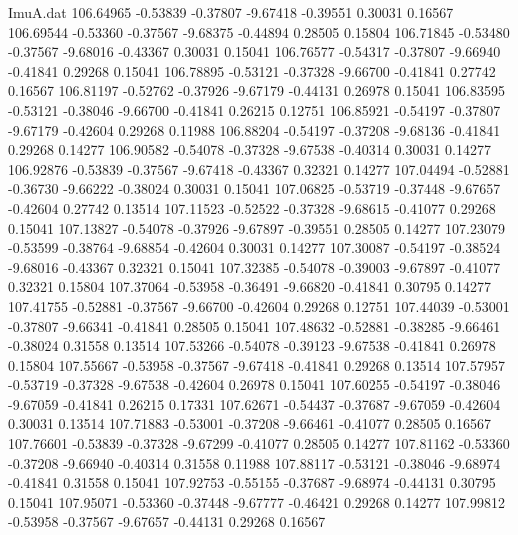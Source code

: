 \begin{filecontents}{ImuA.dat}
 106.64965   -0.53839   -0.37807   -9.67418   -0.39551    0.30031    0.16567
 106.69544   -0.53360   -0.37567   -9.68375   -0.44894    0.28505    0.15804
 106.71845   -0.53480   -0.37567   -9.68016   -0.43367    0.30031    0.15041
 106.76577   -0.54317   -0.37807   -9.66940   -0.41841    0.29268    0.15041
 106.78895   -0.53121   -0.37328   -9.66700   -0.41841    0.27742    0.16567
 106.81197   -0.52762   -0.37926   -9.67179   -0.44131    0.26978    0.15041
 106.83595   -0.53121   -0.38046   -9.66700   -0.41841    0.26215    0.12751
 106.85921   -0.54197   -0.37807   -9.67179   -0.42604    0.29268    0.11988
 106.88204   -0.54197   -0.37208   -9.68136   -0.41841    0.29268    0.14277
 106.90582   -0.54078   -0.37328   -9.67538   -0.40314    0.30031    0.14277
 106.92876   -0.53839   -0.37567   -9.67418   -0.43367    0.32321    0.14277
 107.04494   -0.52881   -0.36730   -9.66222   -0.38024    0.30031    0.15041
 107.06825   -0.53719   -0.37448   -9.67657   -0.42604    0.27742    0.13514
 107.11523   -0.52522   -0.37328   -9.68615   -0.41077    0.29268    0.15041
 107.13827   -0.54078   -0.37926   -9.67897   -0.39551    0.28505    0.14277
 107.23079   -0.53599   -0.38764   -9.68854   -0.42604    0.30031    0.14277
 107.30087   -0.54197   -0.38524   -9.68016   -0.43367    0.32321    0.15041
 107.32385   -0.54078   -0.39003   -9.67897   -0.41077    0.32321    0.15804
 107.37064   -0.53958   -0.36491   -9.66820   -0.41841    0.30795    0.14277
 107.41755   -0.52881   -0.37567   -9.66700   -0.42604    0.29268    0.12751
 107.44039   -0.53001   -0.37807   -9.66341   -0.41841    0.28505    0.15041
 107.48632   -0.52881   -0.38285   -9.66461   -0.38024    0.31558    0.13514
 107.53266   -0.54078   -0.39123   -9.67538   -0.41841    0.26978    0.15804
 107.55667   -0.53958   -0.37567   -9.67418   -0.41841    0.29268    0.13514
 107.57957   -0.53719   -0.37328   -9.67538   -0.42604    0.26978    0.15041
 107.60255   -0.54197   -0.38046   -9.67059   -0.41841    0.26215    0.17331
 107.62671   -0.54437   -0.37687   -9.67059   -0.42604    0.30031    0.13514
 107.71883   -0.53001   -0.37208   -9.66461   -0.41077    0.28505    0.16567
 107.76601   -0.53839   -0.37328   -9.67299   -0.41077    0.28505    0.14277
 107.81162   -0.53360   -0.37208   -9.66940   -0.40314    0.31558    0.11988
 107.88117   -0.53121   -0.38046   -9.68974   -0.41841    0.31558    0.15041
 107.92753   -0.55155   -0.37687   -9.68974   -0.44131    0.30795    0.15041
 107.95071   -0.53360   -0.37448   -9.67777   -0.46421    0.29268    0.14277
 107.99812   -0.53958   -0.37567   -9.67657   -0.44131    0.29268    0.16567

\end{filecontents}

